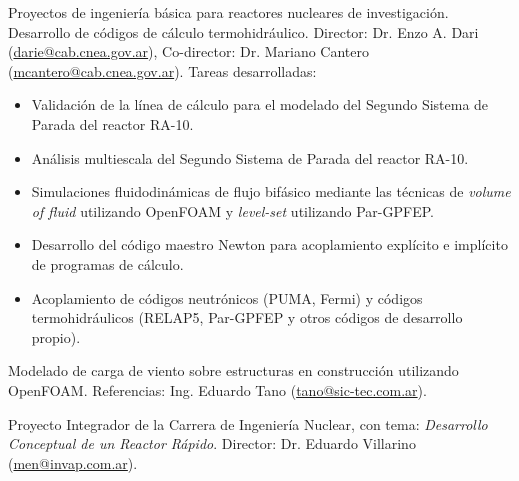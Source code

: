 \documentclass[11pt,a4paper,sans]{moderncv}        %
\begin{document}
{Proyectos de ingeniería básica para reactores nucleares de investigación.\newline{}%
Desarrollo de códigos de cálculo termohidráulico.\newline{}%
Director: Dr. Enzo A. Dari (\href{mailto:darie@cab.cnea.gov.ar}{darie@cab.cnea.gov.ar}), Co-director: Dr. Mariano Cantero (\href{mailto:mcantero@cab.cnea.gov.ar}{mcantero@cab.cnea.gov.ar}).\newline{}%
Tareas desarrolladas:%
\begin{itemize}%
\item Validación de la línea de cálculo para el modelado del Segundo Sistema de Parada del reactor RA-10.
\item Análisis multiescala del Segundo Sistema de Parada del reactor RA-10.
\item Simulaciones fluidodinámicas de flujo bifásico mediante las técnicas de \textit{volume of fluid} utilizando OpenFOAM y \textit{level-set} utilizando Par-GPFEP.
\item Desarrollo del código maestro Newton para acoplamiento explícito e implícito de programas de cálculo.
\item Acoplamiento de códigos neutrónicos (PUMA, Fermi) y códigos termohidráulicos (RELAP5, Par-GPFEP y otros códigos de desarrollo propio).
\end{itemize}}


{Modelado de carga de viento sobre estructuras en construcción utilizando OpenFOAM.\newline{}
Referencias: Ing. Eduardo Tano (\href{mailto:tano@sic-tec.com.ar}{tano@sic-tec.com.ar}).}

{Proyecto Integrador de la Carrera de Ingeniería Nuclear, con tema: \textit{Desarrollo Conceptual de un Reactor Rápido}.\newline{}
Director: Dr. Eduardo Villarino (\href{mailto:men@invap.com.ar}{men@invap.com.ar}).}
\end{document}
